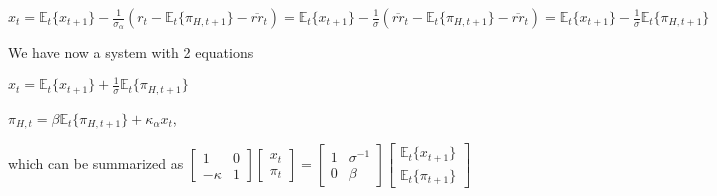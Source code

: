 \documentclass[
]{article}
\begin{document}
\(\displaystyle x_t = \mathbb{E}_t\{x_{t+1}\} -\frac{1}{\sigma_\alpha}(r_t-\mathbb{E}_t\{\pi_{H,t+1}\} -\overline{rr}_t) = \mathbb{E}_t\{x_{t+1}\} -\frac{1}{\sigma}(\overline{rr}_t-\mathbb{E}_t\{\pi_{H,t+1}\} -\overline{rr}_t) = \mathbb{E}_t\{x_{t+1}\} -\frac{1}{\sigma}\mathbb{E}_t\{\pi_{H,t+1}\}\)

We have now a system with 2 equations

\(\displaystyle x_t = \mathbb{E}_t\{x_{t+1}\} +\frac{1}{\sigma}\mathbb{E}_t\{\pi_{H,t+1}\}\)

\(\pi_{H,t}=\beta \mathbb{E}_t\{ \pi_{H,t+1}\} + \kappa_\alpha x_t\),

which can be summarized as
\(\displaystyle \left[ \begin{matrix} 1 & 0\\ -\kappa & 1 \end{matrix} \right] \left[ \begin{matrix} x_t\\ \pi_t \end{matrix} \right] = \left[ \begin{matrix} 1 & \sigma^{-1} \\ 0 & \beta \end{matrix} \right] \left[ \begin{matrix} \mathbb{E}_t\{x_{t+1} \}\\ \mathbb{E}_t \{\pi_{t+1} \} \end{matrix} \right]\)
\end{document}

